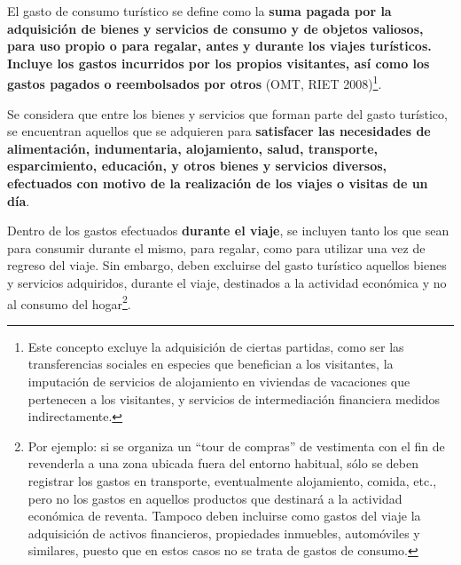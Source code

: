 \documentclass[
]{book}
\begin{document}
El gasto de consumo turístico se define como la \textbf{suma pagada por la adquisición de bienes y servicios de consumo y de objetos valiosos, para uso propio o para regalar, antes y durante los viajes turísticos. Incluye los gastos incurridos por los propios visitantes, así como los gastos pagados o reembolsados por otros} (OMT, RIET 2008)\footnote{Este concepto excluye la adquisición de ciertas partidas, como ser las transferencias sociales en especies que benefician a los visitantes, la imputación de servicios de alojamiento en viviendas de vacaciones que pertenecen a los visitantes, y servicios de intermediación financiera medidos indirectamente.}.

Se considera que entre los bienes y servicios que forman parte del gasto turístico, se encuentran aquellos que se adquieren para \textbf{satisfacer las necesidades de alimentación, indumentaria, alojamiento, salud, transporte, esparcimiento, educación, y otros bienes y servicios diversos, efectuados con motivo de la realización de los viajes o visitas de un día}.

Dentro de los gastos efectuados \textbf{durante el viaje}, se incluyen tanto los que sean para consumir durante el mismo, para regalar, como para utilizar una vez de regreso del viaje. Sin embargo, deben excluirse del gasto turístico aquellos bienes y servicios adquiridos, durante el viaje, destinados a la actividad económica y no al consumo del hogar\footnote{Por ejemplo: si se organiza un ``tour de compras'' de vestimenta con el fin de revenderla a una zona ubicada fuera del entorno habitual, sólo se deben registrar los gastos en transporte, eventualmente alojamiento, comida, etc., pero no los gastos en aquellos productos que destinará a la actividad económica de reventa. Tampoco deben incluirse como gastos del viaje la adquisición de activos financieros, propiedades inmuebles, automóviles y similares, puesto que en estos casos no se trata de gastos de consumo.}.\\
\end{document}
